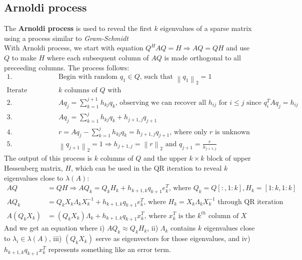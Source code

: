 \documentclass{article}
\newcommand{\norm}[2]{\left\lVert#1\right\rVert_#2}
\begin{document}
\subsection{Arnoldi process}
The \textbf{Arnoldi process} is used to reveal the first $k$ eigenvalues of a sparse matrix using a process similar to \textit{Gram-Schmidt}\\
With Arnoldi process, we start with equation $Q^HAQ = H \Longrightarrow AQ = QH$ and use $Q$ to make $H$ where each subsequent column of $AQ$ is made orthogonal to all preceeding columns. The process follows:
\begin{align*}
    1. \; & \textrm{Begin with random } q_1 \in Q \textrm{, such that } \norm{q_1}{2} = 1\\
    \textrm{Iterate through each of the first } & k \textrm{ columns of $Q$ with }\\
    2. \; & Aq_j = \sum_{k = 1}^{j+1} h_{kj}q_k \textrm{, observing we can recover all $h_{ij}$ for $i \leq j$ since } q_i^TAq_j = h_{ij}\\
    3. \; & Aq_j = \sum_{k = 1}^{j} h_{kj}q_k + h_{j+1, j}q_{j+1}\\
    4. \; & r = Aq_j - \sum_{k = 1}^{j} h_{kj}q_k = h_{j+1, j}q_{j+1} \textrm{, where only $r$ is unknown}\\
    5. \;& \norm{q_{j+1}}{2} = 1 \Longrightarrow h_{j+1, j} = \norm{r}{2} \textrm{ and } q_{j+1} = \frac{r}{h_{j+1, j}}
\end{align*}
The output of this process is $k$ columns of $Q$ and the upper $k \times k$ block of upper Hessenberg matrix, $H$, which can be used in the QR iteration to reveal $k$ eigenvalues close to $\lambda(A)$:
\begin{align*}
    AQ &= QH \Longrightarrow AQ_k = Q_kH_k + h_{k+1,k}q_{k+1}e_k^T \textrm{, where } Q_k = Q[:, 1:k], H_k = [1:k, 1:k]\\
    AQ_k &= Q_kX_k\Lambda_k X_k^{-1} + h_{k+1,k}q_{k+1}e_k^T \textrm{, where } H_k = X_k\Lambda_k X_k^{-1} \textrm{ through QR iteration}\\
    A(Q_kX_k) &= (Q_kX_k)\Lambda_k + h_{k+1,k}q_{k+1}x_k^T \textrm{, where } x_k^T \textrm{ is the $k^{th}$ column of } X
\end{align*}
And we get an equation where i) $AQ_k \approx Q_kH_k$, ii) $\Lambda_k$ contains $k$ eigenvalues close to $\lambda_i \in \lambda(A)$, iii) $(Q_kX_k)$ serve as eigenvectors for those eigenvalues, and iv) $h_{k+1,k}q_{k+1}x_k^T$ represents something like an error term.

\end{document}
